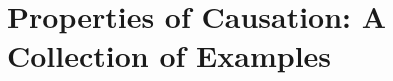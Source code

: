 \documentclass[11pt,a4paper]{book}
\theoremstyle{definition}
\theoremstyle{definition}
\theoremstyle{definition}
\theoremstyle{remark}
\newcommand{\prset}{S_{A}}
\begin{document}




\chapter{Properties of Causation: A Collection of Examples}
\end{document}
